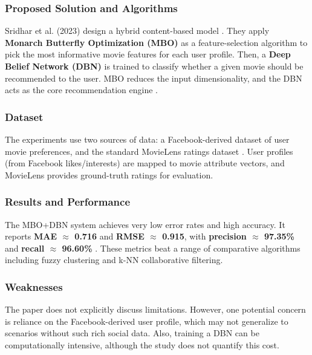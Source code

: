 \subsubsection{Proposed Solution and Algorithms}

Sridhar et al. (2023) design a hybrid content-based model \cite{sridhar2023content}. They apply \textbf{Monarch Butterfly Optimization (MBO)} as a feature-selection algorithm to pick the most informative movie features for each user profile. Then, a \textbf{Deep Belief Network (DBN)} is trained to classify whether a given movie should be recommended to the user. MBO reduces the input dimensionality, and the DBN acts as the core recommendation engine \cite{sridhar2023content}.



\subsubsection{Dataset}

The experiments use two sources of data: a Facebook-derived dataset of user movie preferences, and the standard MovieLens ratings dataset \cite{sridhar2023content}. User profiles (from Facebook likes/interests) are mapped to movie attribute vectors, and MovieLens provides ground-truth ratings for evaluation.



\subsubsection{Results and Performance}

The MBO+DBN system achieves very low error rates and high accuracy. It reports \textbf{MAE $\approx$ 0.716} and \textbf{RMSE $\approx$ 0.915}, with \textbf{precision $\approx$ 97.35\%} and \textbf{recall $\approx$ 96.60\%} \cite{sridhar2023content}. These metrics beat a range of comparative algorithms including fuzzy clustering and k-NN collaborative filtering.



\subsubsection{Weaknesses}

The paper does not explicitly discuss limitations. However, one potential concern is reliance on the Facebook-derived user profile, which may not generalize to scenarios without such rich social data. Also, training a DBN can be computationally intensive, although the study does not quantify this cost.



